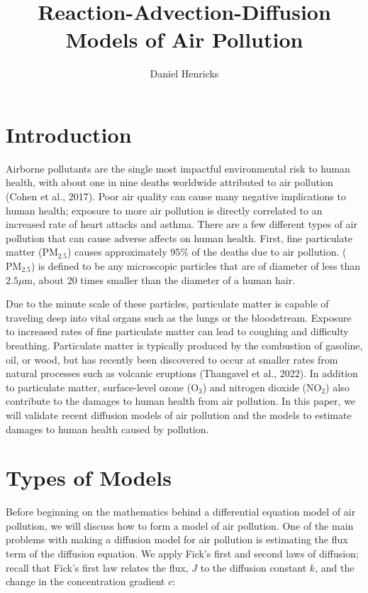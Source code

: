\documentclass{article}
\title{Reaction-Advection-Diffusion Models of Air Pollution}
\author{Daniel Henricks}
\begin{document}
\maketitle

\section{Introduction}

Airborne pollutants are the single most impactful environmental risk to human health, with about one in nine deaths worldwide
attributed to air pollution (Cohen et al., 2017). Poor air quality can cause many negative implications to human health; exposure to
more air pollution is directly correlated to an increased rate of heart attacks and asthma. There are a few different types of air pollution
that can cause adverse affects on human health. First, fine particulate matter ($\text{PM}_{2.5}$) causes approximately 95\% of the deaths due 
to air pollution. ($\text{PM}_{2.5}$) is defined to be any microscopic particles that are of diameter of less than $2.5 \mu$m, about 20 times smaller than the diameter of
a human hair. 

Due to the minute scale of these particles, particulate matter is capable of traveling deep into vital organs such as the lungs or the bloodstream.
Exposure to increased rates of fine particulate matter can lead to coughing and difficulty breathing. Particulate matter is typically produced by the combustion of gasoline, oil, or wood, but has recently
been discovered to occur at smaller rates from natural processes such as volcanic eruptions (Thangavel et al., 2022). In addition to particulate matter, surface-level ozone
($\text{O}_3$) and nitrogen dioxide ($\text{NO}_2$) also contribute to the damages to human health from air pollution. In this paper, we will validate recent diffusion models of 
air pollution and the models to estimate damages to human health caused by pollution.

\section{Types of Models}

Before beginning on the mathematics behind a differential equation model of air pollution, we will discuss how to form a model of air pollution.
One of the main problems with making a diffusion model for air pollution is estimating the flux term of the diffusion equation. We apply Fick's first and second laws of diffusion; 
recall that Fick's first law relates the flux, $J$ to the diffusion constant $k$, and the change in the concentration gradient $c$:
\end{document}
